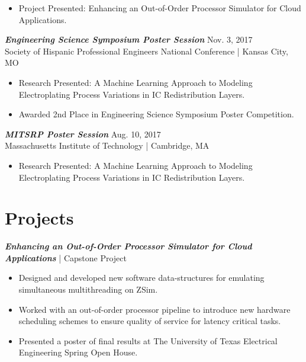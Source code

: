 \documentclass[letter]{res}
\begin{document}
\begin{resume}
 \vspace{-4mm}
    
 \begin{itemize}
 \item Project Presented: Enhancing an Out-of-Order Processor Simulator for Cloud Applications.
 \end{itemize}
 
\vspace{-2mm}
{\sl \textbf{Engineering Science Symposium Poster Session}} \hfill Nov. 3, 2017\\
Society of Hispanic Professional Engineers National Conference | Kansas City, MO \newline

 \vspace{-4mm}
    
 \begin{itemize}
 \item Research Presented: A Machine Learning Approach to Modeling Electroplating Process Variations in IC Redistribution Layers.
 \item Awarded 2nd Place in Engineering Science Symposium Poster Competition.
 \end{itemize}
 
\vspace{-2mm}

{\sl \textbf{MITSRP Poster Session}} \hfill Aug. 10, 2017\\
Massachusetts Institute of Technology | Cambridge, MA\newline

 \vspace{-4mm}
 
\begin{itemize}
 \item Research Presented: A Machine Learning Approach to Modeling Electroplating Process Variations in IC Redistribution Layers.
 \end{itemize}

\vspace{-4mm}

\section{Projects}
{\sl \textbf{Enhancing an Out-of-Order Processor Simulator for Cloud Applications}} | Capstone Project\\

 \vspace{-4mm}
 
\begin{itemize}
 \item Designed and developed new software data-structures for emulating simultaneous multithreading on ZSim.
 \item Worked with an out-of-order processor pipeline to introduce new hardware scheduling schemes to ensure quality of service for latency critical tasks.
 \item Presented a poster of final results at The University of Texas Electrical Engineering Spring Open House.
\end{itemize}


\end{resume}
\end{document}
